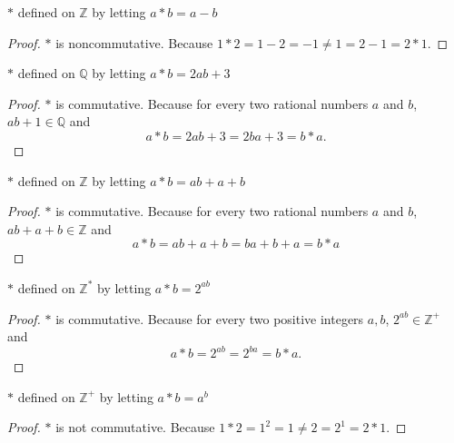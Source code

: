 \newpage
\begin{exercise}
    $*$ defined on $\mathbb{Z}$ by letting $a * b = a - b$
\end{exercise}

\begin{proof}
    $*$ is noncommutative. Because $1 * 2 = 1 - 2 = -1 \ne 1 = 2 - 1 = 2 * 1$.
\end{proof}

\newpage
\begin{exercise}
    $*$ defined on $\mathbb{Q}$ by letting $a * b = 2ab + 3$
\end{exercise}

\begin{proof}
    $*$ is commutative. Because for every two rational numbers $a$ and $b$, $ab + 1\in\mathbb{Q}$ and
    \[
        a * b = 2ab + 3 = 2ba + 3 = b * a.
    \]
\end{proof}

\newpage
\begin{exercise}
    $*$ defined on $\mathbb{Z}$ by letting $a * b = ab + a + b$
\end{exercise}

\begin{proof}
    $*$ is commutative. Because for every two rational numbers $a$ and $b$, $ab + a + b\in\mathbb{Z}$ and
    \[
        a * b = ab + a + b = ba + b + a = b * a
    \]
\end{proof}

\newpage
\begin{exercise}
    $*$ defined on $\mathbb{Z}^{*}$ by letting $a * b = 2^{ab}$
\end{exercise}

\begin{proof}
    $*$ is commutative. Because for every two positive integers $a, b$, $2^{ab}\in\mathbb{Z}^{+}$ and
    \[
        a * b = 2^{ab} = 2^{ba} = b * a.
    \]
\end{proof}

\newpage
\begin{exercise}
    $*$ defined on $\mathbb{Z}^{+}$ by letting $a * b = a^{b}$
\end{exercise}

\begin{proof}
    $*$ is not commutative. Because $1 * 2 = 1^{2} = 1 \ne 2 = 2^{1} = 2 * 1$.
\end{proof}

